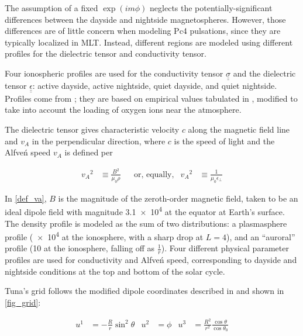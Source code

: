 \documentclass[draft,linenumbers]{agujournal}
\begin{document}
The assumption of a fixed $\exp \left(i m \phi\right)$ neglects the potentially-significant differences between the dayside and nightside magnetospheres. However, those differences are of little concern when modeling Pc4 pulsations, since they are typically localized in MLT\citep{anderson_1990,dai_2015,engebretson_1992,liu_2009}. Instead, different regions are modeled using different profiles for the dielectric tensor and conductivity tensor.


Four ionospheric profiles are used for the conductivity tensor $\underline{\underline{\sigma}}$ and the dielectric tensor $\underline{\underline{\epsilon}}$: active dayside, active nightside, quiet dayside, and quiet nightside. Profiles come from \citet{lysak_2013}; they are based on empirical values tabulated in \citet{kelley_1989}, modified to take into account the loading of oxygen ions near the atmosphere.

The dielectric tensor gives characteristic velocity $c$ along the magnetic field line and $v_A$ in the perpendicular direction, where $c$ is the speed of light and the Alfve\'n speed $v_A$ is defined per

\begin{linenomath*}
\begin{align}
    \label{def_va}
    {v_A}^2 &\equiv \frac{B^2}{\mu_0\rho} &
    & \text{or, equally,} &
    {v_A}^2 &\equiv \frac{1}{\mu_0\epsilon_\bot}
\end{align}
\end{linenomath*}

In \cref{def_va}, $B$ is the magnitude of the zeroth-order magnetic field, taken to be an ideal dipole field with magnitude \SI{3.1e4}{\nT} at the equator at Earth's surface. The density profile is modeled as the sum of two distributions: a plasmasphere profile (\SI{e4}{\percc} at the ionosphere, with a sharp drop at $L = 4$), and an ``auroral'' profile (\SI{10}{\percc} at the ionosphere, falling off as $\frac{1}{r}$). Four different physical parameter profiles are used for conductivity and Alfve\'n speed, corresponding to dayside and nightside conditions at the top and bottom of the solar cycle.


Tuna's grid follows the modified dipole coordinates described in \citet{lysak_2004} and shown in \cref{fig_grid}:
\begin{linenomath*}
\begin{align}
  \label{def_coords}
  u^1 & = - \frac{R}{r} \sin^2 \theta &
  u^2 & = \phi &
  u^3 & = \frac{R^2}{r^2} \frac{\cos \theta}{\cos \theta_0}
\end{align}
\end{linenomath*}
\end{document}
